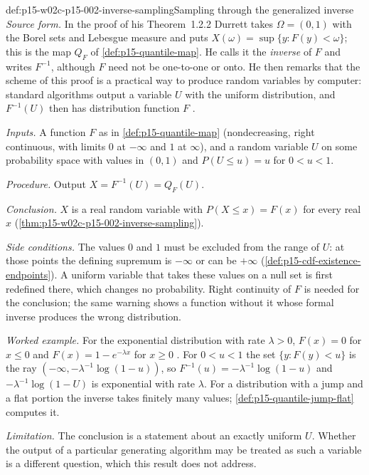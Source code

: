 \begin{hbmethod}{def:p15-w02c-p15-002-inverse-sampling}{Sampling through the generalized inverse}
\emph{Source form.} In the proof of his Theorem~1.2.2 Durrett takes
\(\Omega=(0,1)\) with the Borel sets and Lebesgue measure and puts
\(X(\omega)=\sup\{y:F(y)<\omega\}\); this is the map \(Q_F\) of
\cref{def:p15-quantile-map}. He calls it the \emph{inverse} of \(F\) and
writes \(F^{-1}\), although \(F\) need not be one-to-one or onto. He then
remarks that the scheme of this proof is a practical way to produce random
variables by computer: standard algorithms output a variable \(U\) with
the uniform distribution, and \(F^{-1}(U)\) then has distribution
function \(F\) \cite[Theorem~1.2.2, p.~11]{DurrettPTEAuthor2019}.

\emph{Inputs.} A function \(F\) as in \cref{def:p15-quantile-map}
(nondecreasing, right continuous, with limits \(0\) at \(-\infty\) and
\(1\) at \(\infty\)), and a random variable \(U\) on some probability
space with values in \((0,1)\) and \(P(U\leq u)=u\) for \(0<u<1\).

\emph{Procedure.} Output \(X=F^{-1}(U)=Q_F(U)\).

\emph{Conclusion.} \(X\) is a real random variable with
\(P(X\leq x)=F(x)\) for every real \(x\)
(\cref{thm:p15-w02c-p15-002-inverse-sampling}).

\emph{Side conditions.} The values \(0\) and \(1\) must be excluded from
the range of \(U\): at those points the defining supremum is \(-\infty\)
or can be \(+\infty\) (\cref{def:p15-cdf-existence-endpoints}). A
uniform variable that takes these values on a null set is first redefined
there, which changes no probability. Right continuity of \(F\) is needed
for the conclusion; the same warning shows a function without it whose
formal inverse produces the wrong distribution.

\emph{Worked example.} For the exponential distribution with rate
\(\lambda>0\), \(F(x)=0\) for \(x\leq0\) and \(F(x)=1-e^{-\lambda x}\) for
\(x\geq0\) \cite[Example~1.2.4, p.~12]{DurrettPTEAuthor2019}. For
\(0<u<1\) the set \(\{y:F(y)<u\}\) is the ray
\((-\infty,-\lambda^{-1}\log(1-u))\), so
\(F^{-1}(u)=-\lambda^{-1}\log(1-u)\) and
\(-\lambda^{-1}\log(1-U)\) is exponential with rate \(\lambda\). For a
distribution with a jump and a flat portion the inverse takes finitely
many values; \cref{def:p15-quantile-jump-flat} computes it.

\emph{Limitation.} The conclusion is a statement about an exactly uniform
\(U\). Whether the output of a particular generating algorithm may be
treated as such a variable is a different question, which this result does
not address.
\end{hbmethod}


